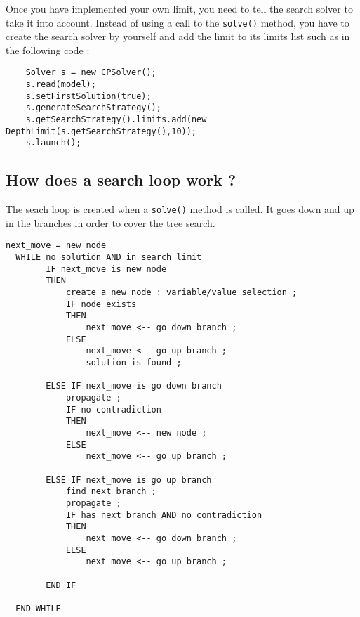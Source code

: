 Once you have implemented your own limit, you need to tell the search solver to take it into account. Instead of using a call to the \texttt{solve()} method, you have to create the search solver by yourself and add the limit to its limits list such as in the following code :
\begin{lstlisting}
	Solver s = new CPSolver();
	s.read(model);
	s.setFirstSolution(true);
	s.generateSearchStrategy();
	s.getSearchStrategy().limits.add(new DepthLimit(s.getSearchStrategy(),10));
	s.launch();
\end{lstlisting}


\subsection{How does a search loop work ?}\label{advanced:howdoesasearchloopwork}\hypertarget{advanced:howdoesasearchloopwork}{}
The seach loop is created when a \texttt{solve()} method is called. It goes down and up in the branches in order to cover the tree search. 

\begin{lstlisting}[title={Algorithm of the search loop in Choco}]
  next_move = new node
  WHILE no solution AND in search limit
        IF next_move is new node
	    THEN
	        create a new node : variable/value selection ;
	        IF node exists 
	        THEN
	            next_move <-- go down branch ;            
	        ELSE 
	            next_move <-- go up branch ;
	            solution is found ;
	
	    ELSE IF next_move is go down branch
	        propagate ;
	        IF no contradiction 
	        THEN
	            next_move <-- new node ;                        
	        ELSE
	            next_move <-- go up branch ;
	        
	    ELSE IF next_move is go up branch 
	        find next branch ;
	        propagate ;
	        IF has next branch AND no contradiction
	        THEN
	            next_move <-- go down branch ;                            
	        ELSE
	            next_move <-- go up branch ;
	
	    END IF
	
  END WHILE
\end{lstlisting}

